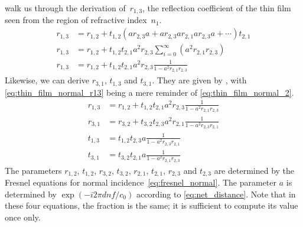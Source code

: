  walk us through the derivation of~$r_{1, 3}$, the reflection coefficient of the thin film seen from the region of refractive index~$n_1$.
\begin{align}
    r_{1,3}
    &= r_{1,2} + t_{1,2}
        \left(
            a r_{2,3} a +
            a r_{2,3} a r_{2,1} a r_{2,3} a +
            \cdots
        \right)
       t_{2,1}
    \label{eq:thin_film_normal_0}
    \\
    r_{1, 3}
    &=
    r_{1, 2} + t_{1, 2} t_{2, 1} a^2r_{2, 3}
        \sum_{i=0}^{\infty} (a^2r_{2,1}r_{2,3})
    \label{eq:thin_film_normal_1}
    \\
    r_{1, 3}
    &=
    r_{1, 2} + t_{1, 2} t_{2, 1} a^2 r_{2, 3}
    \frac{1}{1 - a^2 r_{2, 1} r_{2, 3}}
    \label{eq:thin_film_normal_2}
\end{align}
Likewise, we can derive $r_{3, 1}$, $t_{1, 3}$ and $t_{3, 1}$.
They are given by ,
with \cref{eq:thin_film_normal_r13} being a mere reminder of \cref{eq:thin_film_normal_2}.
\begin{subequations}
    \begin{align}
        r_{1, 3}
        &=
        r_{1, 2} + t_{1, 2} t_{2, 1} a^2 r_{2, 3}
        \frac{1}{1 - a^2 r_{2, 1} r_{2, 3}}
        \label{eq:thin_film_normal_r13}
        \\
        r_{3, 1}
        &=
        r_{3, 2} + t_{3, 2} t_{2, 3} a^2 r_{2, 1}
        \frac{1}{1 - a^2 r_{2, 3} r_{2, 1}}
        \label{eq:thin_film_normal_r31}
        \\
        t_{1, 3}
        &=
        t_{1,2} t_{2,3} a \frac{1}{1 - a^2 r_{2, 3} r_{2, 1}}
        \label{eq:thin_film_normal_t13}
        \\
        t_{3, 1}
        &=
        t_{3,2} t_{2,1} a \frac{1}{1 - a^2 r_{2, 1} r_{2, 3}}
        \label{eq:thin_film_normal_t31}
    \end{align}
\end{subequations}
The parameters $r_{1, 2}$, $t_{1, 2}$, $r_{3, 2}$, $t_{3, 2}$, $r_{2, 1}$, $t_{2, 1}$,
$r_{2, 3}$ and $t_{2, 3}$ are determined by the Fresnel equations for normal incidence~\eqref{eq:fresnel_normal}.
The parameter $a$ is determined by $\exp(-i 2 \pi d n f / c_0)$ according to \cref{eq:net_distance}.
Note that in these four equations, the fraction is the same;
it is sufficient to compute its value once only.



